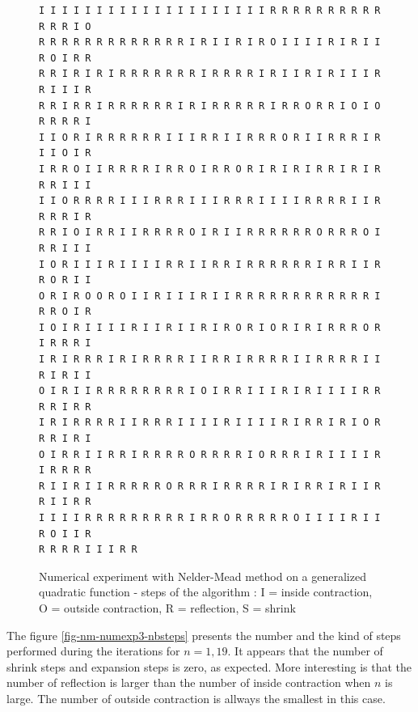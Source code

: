 \begin{figure}[htbp]
\begin{center}
\begin{tiny}
\begin{verbatim}
I I I I I I I I I I I I I I I I I I I I R R R R R R R R R R R R R I O 
R R R R R R R R R R R R R I R I I R I R O I I I I R I R I I R O I R R 
R R I R I R I R R R R R R R I R R R R I R I I R I R I I I R R I I I R 
R R I R R I R R R R R R I R I R R R R R I R R O R R I O I O R R R R I 
I I O R I R R R R R R I I I R R I I R R R O R I I R R R I R I I O I R 
I R R O I I R R R R I R R O I R R O R I R I R I R R I R I R R R I I I 
I I O R R R R I I I R R R I I I R R R I I I I R R R R I I R R R R I R 
R R I O I R R I I R R R R O I R I I R R R R R R O R R R O I R R I I I 
I O R I I I R I I I I R R I I R R I R R R R R R I R R I I R R O R I I 
O R I R O O R O I I R I I I R I I R R R R R R R R R R R R I R R O I R 
I O I R I I I I R I I R I I R I R O R I O R I R I R R R O R I R R R I 
I R I R R R I R I R R R R I I R R I R R R R I I R R R R I I R I R I I 
O I R I I R R R R R R R R I O I R R I I I R I R I I I I R R R R I R R 
I R I R R R R I I R R R I I I I R I I I I R I R R I R I O R R R I R I 
O I R R I I R R I R R R R O R R R R I O R R R I R I I I I R I R R R R 
R I I R I I R R R R R O R R R I R R R R I R I R R I R I I R R I I R R 
I I I I R R R R R R R R R I R R O R R R R R O I I I I R I I R O I I R 
R R R R I I I R R
\end{verbatim}
\end{tiny}
\end{center}
\caption{Numerical experiment with Nelder-Mead method on a generalized 
quadratic function - steps of the algorithm : I = inside contraction, O = outside contraction, 
R = reflection, S = shrink}
\label{fig-nm-numexp3-steps}
\end{figure}

The figure \ref{fig-nm-numexp3-nbsteps} presents the number and 
the kind of steps performed during the iterations for $n=1,19$.
It appears that the number of shrink steps and expansion steps is zero, as expected.
More interesting is that the number of reflection is 
larger than the number of inside contraction when $n$ 
is large. The number of outside contraction is allways 
the smallest in this case.

